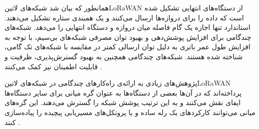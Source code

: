 
همانطور که بیان شد شبکه‌های ‌لاتین{LoRaWAN} از دستگاه‌های انتهایی تشکیل شده است که داده را برای دروازه‌ها ارسال می‌کنند و یک همبندی ستاره تشکیل می‌دهند.
استاندارد تنها اجازه یک گام فاصله میان دروازه و دستگاه انتهایی را می‌دهد.
شبکه‌های چندگامی برای افزایش پوشش‌دهی و بهبود توان مصرفی شبکه‌های بی‌سیم،
با توجه به افزایش طول عمر باتری به دلیل توان ارسالی کمتر در مقایسه با شبکه‌های تک گامی،
شناخته شده هستند.
شبکه‌های چندگامی همچنین به بهبود گسترش‌پذیری، ظرفیت و قابلیت اطمینان نیز کمک می‌کنند
.

پژوهش‌های زیادی به ارائه‌ی راه‌کارهای چندگامی در شبکه‌های ‌لاتین{LoRaWAN} پرداخته‌اند که در آن‌ها بعضی از دستگاه‌ها به عنوان گره میانی برای سایر دستگاه‌ها ایفای نقش می‌کنند و
به این ترتیب پوشش شبکه را گسترش می‌دهند. این گره‌های میانی می‌توانند کارکردهای یک رله ساده و یا پروتکل‌های مسیریابی پیچیده را پیاده‌سازی کنند
.
